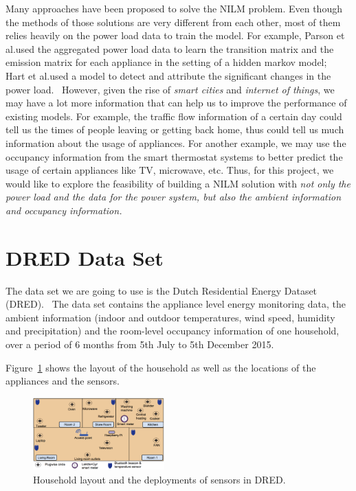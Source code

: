 \documentclass[sigconf]{acmart}
\begin{document}
Many approaches have been proposed to solve the NILM problem. Even
though the methods of those solutions are very different from each
other, most of them relies heavily on the power load data to train the
model. For example, Parson et al.\@ used the aggregated power load
data to learn the transition matrix and the emission matrix for each
appliance in the setting of a hidden markov
model;~\cite{parson2012non} Hart et al.\@ used a model to detect and
attribute the significant changes in the power
load.~\cite{hart1992nonintrusive} However, given the rise of
\emph{smart cities} and \emph{internet of things}, we may have a lot
more information that can help us to improve the performance of
existing models. For example, the traffic flow information of a
certain day could tell us the times of people leaving or getting back
home, thus could tell us much information about the usage of
appliances. For another example, we may use the occupancy information
from the smart thermostat systems to better predict the usage of
certain appliances like TV, microwave, etc. Thus, for this project, we
would like to explore the feasibility of building a NILM solution with
\emph{not only the power load and the data for the power system, but
  also the ambient information and occupancy information.}

\section{DRED Data Set}

The data set we are going to use is the Dutch Residential Energy
Dataset (DRED).~\cite{uttama2015loced} The data set contains the
appliance level energy monitoring data, the ambient information
(indoor and outdoor temperatures, wind speed, humidity and
precipitation) and the room-level occupancy information of one
household, over a period of 6 months from 5th July to 5th December
2015.~\cite{uttama2015loced}

Figure~\ref{fig:dred} shows the layout of the household as well as the
locations of the appliances and the sensors.

\begin{figure}[ht]
  \centering
  \includegraphics[width=0.45\textwidth]{figures/dred}
  \caption{\label{fig:dred} Household layout and the deployments of
    sensors in DRED.~\cite{uttama2015loced}}
\end{figure}
\end{document}

